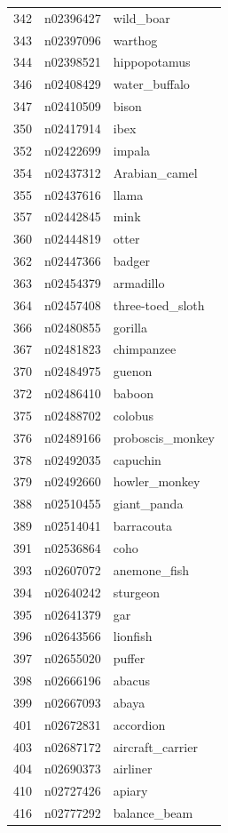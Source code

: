 \begin{table}
\begin{tabular}{cll}
342 & n02396427 & wild_boar \\
343 & n02397096 & warthog \\
344 & n02398521 & hippopotamus \\
346 & n02408429 & water_buffalo \\
347 & n02410509 & bison \\
350 & n02417914 & ibex \\
352 & n02422699 & impala \\
354 & n02437312 & Arabian_camel \\
355 & n02437616 & llama \\
357 & n02442845 & mink \\
360 & n02444819 & otter \\
362 & n02447366 & badger \\
363 & n02454379 & armadillo \\
364 & n02457408 & three-toed_sloth \\
366 & n02480855 & gorilla \\
367 & n02481823 & chimpanzee \\
370 & n02484975 & guenon \\
372 & n02486410 & baboon \\
375 & n02488702 & colobus \\
376 & n02489166 & proboscis_monkey \\
378 & n02492035 & capuchin \\
379 & n02492660 & howler_monkey \\
388 & n02510455 & giant_panda \\
389 & n02514041 & barracouta \\
391 & n02536864 & coho \\
393 & n02607072 & anemone_fish \\
394 & n02640242 & sturgeon \\
395 & n02641379 & gar \\
396 & n02643566 & lionfish \\
397 & n02655020 & puffer \\
398 & n02666196 & abacus \\
399 & n02667093 & abaya \\
401 & n02672831 & accordion \\
403 & n02687172 & aircraft_carrier \\
404 & n02690373 & airliner \\
410 & n02727426 & apiary \\
416 & n02777292 & balance_beam \\

\end{tabular}
\end{table}
